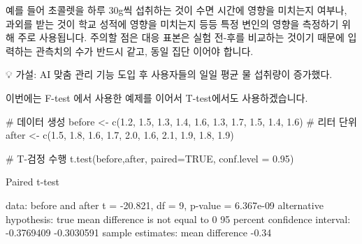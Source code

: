 \documentclass[
  letterpaper,
]{book}
\newenvironment{Shaded}{\begin{snugshade}}{\end{snugshade}}
\newcommand{\AttributeTok}[1]{\textcolor[rgb]{0.40,0.45,0.13}{#1}}
\newcommand{\CommentTok}[1]{\textcolor[rgb]{0.37,0.37,0.37}{#1}}
\newcommand{\ConstantTok}[1]{\textcolor[rgb]{0.56,0.35,0.01}{#1}}
\newcommand{\DecValTok}[1]{\textcolor[rgb]{0.68,0.00,0.00}{#1}}
\newcommand{\FloatTok}[1]{\textcolor[rgb]{0.68,0.00,0.00}{#1}}
\newcommand{\FunctionTok}[1]{\textcolor[rgb]{0.28,0.35,0.67}{#1}}
\newcommand{\NormalTok}[1]{\textcolor[rgb]{0.00,0.23,0.31}{#1}}
\newcommand{\OtherTok}[1]{\textcolor[rgb]{0.00,0.23,0.31}{#1}}
\newcommand{\SpecialCharTok}[1]{\textcolor[rgb]{0.37,0.37,0.37}{#1}}
\renewenvironment{Shaded}
    {\begin{snugshade}
    \begin{singlespace}
    \linespread{1}
    }
    {\end{singlespace}
    \end{snugshade}
}
\begin{document}
\begin{itemize}
  예를 들어 초콜렛을 하루 30g씩 섭취하는 것이 수면 시간에 영향을
  미치는지 여부나, 과외를 받는 것이 학교 성적에 영향을 미치는지 등등
  특정 변인의 영향을 측정하기 위해 주로 사용됩니다. 주의할 점은 대응
  표본은 실험 전-후를 비교하는 것이기 때문에 입력하는 관측치의 수가
  반드시 같고, 동일 집단 이어야 합니다.

  💡 가설: AI 맞춤 관리 기능 도입 후 사용자들의 일일 평균 물 섭취량이
  증가했다.

  이번에는 F-test 에서 사용한 예제를 이어서 T-test에서도 사용하겠습니다.

\begin{Shaded}
\begin{Highlighting}[]
\CommentTok{\# 데이터 생성}
\NormalTok{before }\OtherTok{\textless{}{-}} \FunctionTok{c}\NormalTok{(}\FloatTok{1.2}\NormalTok{, }\FloatTok{1.5}\NormalTok{, }\FloatTok{1.3}\NormalTok{, }\FloatTok{1.4}\NormalTok{, }\FloatTok{1.6}\NormalTok{, }\FloatTok{1.3}\NormalTok{, }\FloatTok{1.7}\NormalTok{, }\FloatTok{1.5}\NormalTok{, }\FloatTok{1.4}\NormalTok{, }\FloatTok{1.6}\NormalTok{)  }\CommentTok{\# 리터 단위}
\NormalTok{after }\OtherTok{\textless{}{-}} \FunctionTok{c}\NormalTok{(}\FloatTok{1.5}\NormalTok{, }\FloatTok{1.8}\NormalTok{, }\FloatTok{1.6}\NormalTok{, }\FloatTok{1.7}\NormalTok{, }\FloatTok{2.0}\NormalTok{, }\FloatTok{1.6}\NormalTok{, }\FloatTok{2.1}\NormalTok{, }\FloatTok{1.9}\NormalTok{, }\FloatTok{1.8}\NormalTok{, }\FloatTok{1.9}\NormalTok{)}

\CommentTok{\# T{-}검정 수행}
\FunctionTok{t.test}\NormalTok{(before,after, }\AttributeTok{paired=}\ConstantTok{TRUE}\NormalTok{, }\AttributeTok{conf.level =} \FloatTok{0.95}\NormalTok{)}
\end{Highlighting}
\end{Shaded}

\begin{Shaded}
\begin{Highlighting}[]
\NormalTok{Paired t}\SpecialCharTok{{-}}\NormalTok{test}

\NormalTok{data}\SpecialCharTok{:}\NormalTok{  before and after}
\NormalTok{t }\OtherTok{=} \SpecialCharTok{{-}}\FloatTok{20.821}\NormalTok{, df }\OtherTok{=} \DecValTok{9}\NormalTok{, p}\SpecialCharTok{{-}}\NormalTok{value }\OtherTok{=} \FloatTok{6.367e{-}09}
\NormalTok{alternative hypothesis}\SpecialCharTok{:}\NormalTok{ true mean difference is not equal to }\DecValTok{0}
\DecValTok{95}\NormalTok{ percent confidence interval}\SpecialCharTok{:}
 \SpecialCharTok{{-}}\FloatTok{0.3769409} \SpecialCharTok{{-}}\FloatTok{0.3030591}
\NormalTok{sample estimates}\SpecialCharTok{:}
\NormalTok{mean difference }
          \SpecialCharTok{{-}}\FloatTok{0.34} 
\end{Highlighting}
\end{Shaded}


\end{itemize}
\end{document}
